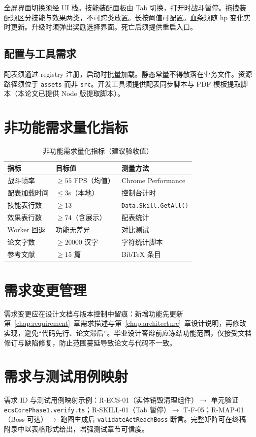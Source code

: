 全屏界面切换须经 UI 栈。技能装配面板由 Tab 切换，打开时战斗暂停。拖拽装配须区分技能与效果两类，不可跨类放置。长按阈值可配置。血条须随 hp 变化实时更新。升级时须弹出奖励选择界面。死亡后须提供重启入口\cite{heijstek2011empirical}。

\subsection{配置与工具需求}

配表须通过 registry 注册，启动时批量加载。静态常量不得散落在业务文件。资源路径须位于 \texttt{assets} 而非 \texttt{src}。开发工具须提供配表同步脚本与 PDF 模板提取脚本（本论文已提供 Node 版提取脚本）。

\section{非功能需求量化指标}

\begin{table}[htbp]
  \centering
  \caption{非功能需求量化指标（建议验收值）}
  \begin{tabular}{lll}
    \toprule
    \textbf{指标} & \textbf{目标值} & \textbf{测量方法} \\
    \midrule
    战斗帧率 & $\geq 55$ FPS（均值） & Chrome Performance \\
    配表加载时间 & $\leq 3$s（本地） & 控制台计时 \\
    技能表行数 & $\geq 13$ & \texttt{Data.Skill.GetAll()} \\
    效果表行数 & $\geq 74$（含展示） & 配表统计 \\
    Worker 回退 & 功能无差异 & 对比测试 \\
    论文字数 & $\geq 20000$ 汉字 & 字符统计脚本 \\
    参考文献 & $\geq 15$ 篇 & BibTeX 条目 \\
    \bottomrule
  \end{tabular}
\end{table}

\section{需求变更管理}

需求变更应在设计文档与版本控制中留痕：新增功能先更新第~\ref{chap:requirement}~章需求描述与第~\ref{chap:architecture}~章设计说明，再修改实现，避免“代码先行、论文滞后”。毕业设计答辩前应冻结功能范围，仅接受文档修订与缺陷修复，防止范围蔓延导致论文与代码不一致\cite{munaiah2017github}。

\section{需求与测试用例映射}

需求 ID 与测试用例映射示例：R-ECS-01（实体销毁清理组件）$\rightarrow$ 单元验证 \texttt{ecsCorePhase1.verify.ts}；R-SKILL-01（Tab 暂停）$\rightarrow$ T-F-05；R-MAP-01（Boss 可达）$\rightarrow$ 跑图生成后 \texttt{validateActReachBoss} 断言。完整矩阵可在终稿附录中以表格形式给出，增强测试章节可信度\cite{petty2010vv}。
